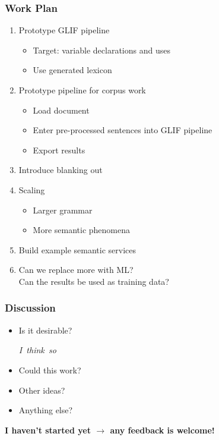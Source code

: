 \documentclass{beamer}
\newcommand{\com}[1]{\strut\hfil\strut\null\nobreak\hfill\hbox{{\itshape \color{black!50}#1}}\par}
\begin{document}
\begin{frame}
    \frametitle{Work Plan}

    \begin{enumerate}
        \item Prototype GLIF pipeline
            \begin{itemize}
                \item Target: variable declarations and uses
                \item Use generated lexicon
            \end{itemize}
        \item Prototype pipeline for corpus work
            \begin{itemize}
                \item Load document
                \item Enter pre-processed sentences into GLIF pipeline
                \item Export results
            \end{itemize}
        \item Introduce blanking out
        \item Scaling
            \begin{itemize}
                \item Larger grammar
                \item More semantic phenomena
            \end{itemize}
        \item Build example semantic services
        \item Can we replace more with ML?\\Can the results be used as training data?
    \end{enumerate}
\end{frame}


\begin{frame}
    \frametitle{Discussion}
    \begin{itemize}
        \item Is it desirable? \com{I think so}
        \item Could this work?
        \item Other ideas?
        \item Anything else?
    \end{itemize}

    \vspace{2em}
    \centering
    \textbf{I haven't started yet \boldmath $\rightarrow$ any feedback is welcome!}
\end{frame}
\end{document}
